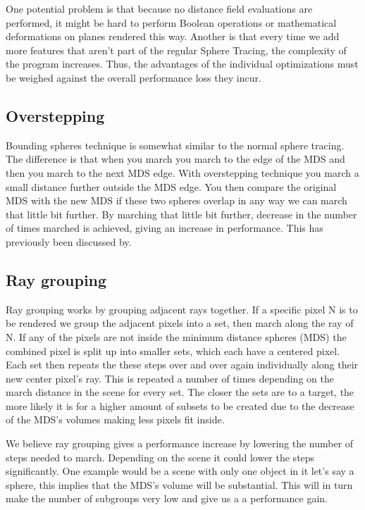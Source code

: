 			One potential problem is that because no distance field evaluations 
			are performed, it might be hard to perform Boolean operations or 
			mathematical deformations on planes rendered this way. Another is 
			that every time we add more features that aren't part of the 
			regular Sphere Tracing, the complexity of the program increases. 
			Thus, the advantages of the individual optimizations must be 
			weighed against the overall performance loss they incur. 

		\subsection{Overstepping}

			Bounding spheres technique is somewhat similar to the normal sphere
			tracing. The difference is that when you march you march to the edge of
			the MDS and then you march to the next MDS edge. With overstepping
			technique you march a small distance further outside the MDS edge. You
			then compare the original MDS with the new MDS if these two spheres
			overlap in any way we can march that little bit further. By marching that
			little bit further, decrease in the number of times marched is achieved,
			giving an increase in performance. This has previously been discussed
			by\cite{Korndorfer2014}. 

		\subsection{Ray grouping}
		
			Ray grouping works by grouping adjacent rays together. If a
			specific pixel N is to be rendered we group the adjacent pixels
			into a set, then march along the ray of N. If any of the pixels are
			not inside the minimum distance spheres (MDS) the combined pixel is
			split up into smaller sets, which each have a centered pixel. Each
			set then repeats the these steps over and over again individually
			along their new center pixel's ray. This is repeated a number of
			times depending on the march distance in the scene for every set.
			The closer the sets are to a target, the more likely it is for a
			higher amount of subsets to be created due to the decrease of the
			MDS's volumes making less pixels fit inside.
			
			We believe ray grouping gives a performance increase by lowering
			the number of steps needed to march. Depending on the scene it
			could lower the steps significantly. One example would be a scene
			with only one object in it let's say a sphere, this implies that
			the MDS's volume will be substantial. This will in turn make the
			number of subgroups very low and give us a a performance gain. 
			
